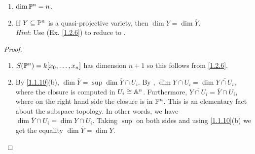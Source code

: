\label{1.2.7}

\begin{enumerate}[label = (\alph*)]
    \item $\dim \P^n = n$.
    
    \item If $Y \subseteq \P^n$ is a quasi-projective variety, then $\dim Y = \dim \overline{Y}$.\\
    \textit{Hint}: Use (Ex. \ref{1.2.6}) to reduce to \cite[1.10]{hartshorne}.
\end{enumerate}

\begin{proof}
\begin{enumerate}[label = (\alph*)]
    \item $S(\P^n) = k[x_0, \dots, x_n]$ has dimension $n + 1$ so this follows from \ref{1.2.6}.

    \item By \ref{1.1.10}(b), $\dim \overline Y = \sup \dim \overline Y \cap U_i$. By \cite[1.10]{hartshorne}, $\dim Y \cap U_i = \dim \overline{Y \cap U_i}$, where the closure is computed in $U_i \cong \A^n$. Furthermore, $\overline{Y \cap U_i} = \overline{Y} \cap U_i$, where on the right hand side the closure is in $\P^n$. This is an elementary fact about the subspace topology. In other words, we have $\dim \overline Y \cap U_i = \dim Y \cap U_i$. Taking $\sup$ on both sides and using \ref{1.1.10}(b) we get the equality $\dim \overline Y = \dim Y$.
\end{enumerate}
\end{proof}
